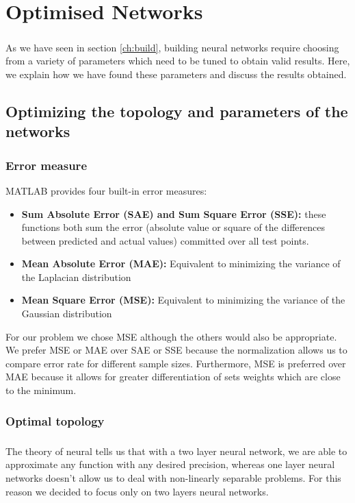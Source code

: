 \documentclass[a4paper,12pt,oneside,final]{report}
\begin{document}
\chapter{Optimised Networks}
\paragraph{}
As we have seen in section \ref{ch:build}, building neural networks require choosing from a variety of parameters which need to be tuned to obtain valid results. Here, we explain how we have found these parameters and discuss the results obtained.
\section{Optimizing the topology and parameters of the networks}
\subsection{Error measure}
MATLAB provides four built-in error measures:
\begin{itemize}
\item { \bf Sum Absolute Error (SAE) and Sum Square Error (SSE):} these functions both sum the error (absolute value or square of the differences between predicted and actual values) committed over all test points. %
\item { \bf Mean Absolute Error (MAE):} Equivalent to minimizing the variance of the Laplacian distribution
\item { \bf Mean Square Error (MSE):} Equivalent to minimizing the variance of the Gaussian distribution
\end{itemize}
For our problem we chose MSE although the others would also be appropriate.  We prefer MSE or MAE over SAE or SSE because the normalization allows us to compare error rate for different sample sizes.  Furthermore, MSE is preferred over MAE because it allows for greater differentiation of sets weights which are close to the minimum.
\subsection{Optimal topology}
\paragraph{}
The theory of neural tells us that with a two layer neural network, we are able to approximate any function with any desired precision, whereas one layer neural networks doesn't allow us to deal with non-linearly separable problems. For this reason we decided to focus only on two layers neural networks.
\end{document}
